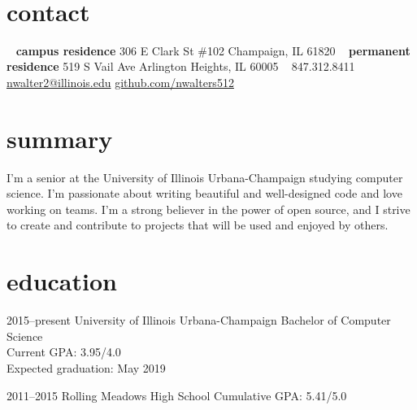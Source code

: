 \documentclass[nofooter]{resume}
\begin{document}


\begin{aside} %
~\vspace{-0.42cm} %
\section{contact}
\vspace{-0.16cm} %
~
\textbf{campus residence}
306 E Clark St \#102
Champaign, IL
61820
~
\textbf{permanent residence}
519 S Vail Ave
Arlington Heights, IL
60005
~
847.312.8411
~
\href{mailto:nwalter2@illinois.edu}{nwalter2@illinois.edu}
\href{http://github.com/nwalters512}{github.com/nwalters512}
\end{aside}


\section{summary}

I'm a senior at the University of Illinois Urbana-Champaign studying computer science.  I'm passionate about writing beautiful and well-designed code and love working on teams. I'm a strong believer in the power of open source, and I strive to create and contribute to projects that will be used and enjoyed by others.


\section{education}

\begin{entrylist}


\entry
{2015--present}
{University of Illinois Urbana-Champaign}
{}
{Bachelor of Computer Science \\
Current GPA: 3.95/4.0 \\
Expected graduation: May 2019}


\entry
{2011--2015}
{Rolling Meadows High School}
{}
{Cumulative GPA: 5.41/5.0}


\end{entrylist}
\end{document}
